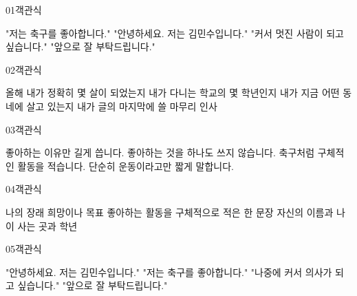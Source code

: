 \documentclass[fs13,seriesSau]{korfarm-base}
\begin{document}
\begin{kfQBlock}{01}{객관식}
\begin{kfChoices}
\kfChoice "저는 축구를 좋아합니다."
\kfChoice "안녕하세요. 저는 김민수입니다."
\kfChoice "커서 멋진 사람이 되고 싶습니다."
\kfChoice "앞으로 잘 부탁드립니다."
\end{kfChoices}
\end{kfQBlock}
\begin{kfQBlock}{02}{객관식}
\begin{kfChoices}
\kfChoice 올해 내가 정확히 몇 살이 되었는지
\kfChoice 내가 다니는 학교의 몇 학년인지
\kfChoice 내가 지금 어떤 동네에 살고 있는지
\kfChoice 내가 글의 마지막에 쓸 마무리 인사
\end{kfChoices}
\end{kfQBlock}
\begin{kfQBlock}{03}{객관식}
\begin{kfChoices}
\kfChoice 좋아하는 이유만 길게 씁니다.
\kfChoice 좋아하는 것을 하나도 쓰지 않습니다.
\kfChoice 축구처럼 구체적인 활동을 적습니다.
\kfChoice 단순히 운동이라고만 짧게 말합니다.
\end{kfChoices}
\end{kfQBlock}
\begin{kfQBlock}{04}{객관식}
\begin{kfChoices}
\kfChoice 나의 장래 희망이나 목표
\kfChoice 좋아하는 활동을 구체적으로 적은 한 문장
\kfChoice 자신의 이름과 나이
\kfChoice 사는 곳과 학년
\end{kfChoices}
\end{kfQBlock}
\begin{kfQBlock}{05}{객관식}
\begin{kfChoices}
\kfChoice "안녕하세요. 저는 김민수입니다."
\kfChoice "저는 축구를 좋아합니다."
\kfChoice "나중에 커서 의사가 되고 싶습니다."
\kfChoice "앞으로 잘 부탁드립니다."
\end{kfChoices}
\end{kfQBlock}


\end{document}
